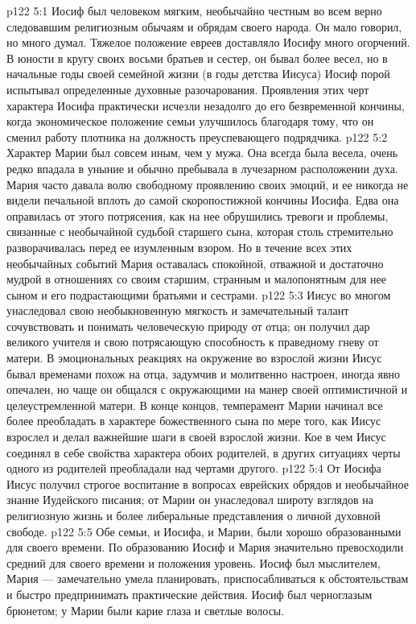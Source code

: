 \vs p122 5:1 Иосиф был человеком мягким, необычайно честным во всем верно следовавшим религиозным обычаям и обрядам своего народа. Он мало говорил, но много думал. Тяжелое положение евреев доставляло Иосифу много огорчений. В юности в кругу своих восьми братьев и сестер, он бывал более весел, но в начальные годы своей семейной жизни (в годы детства Иисуса) Иосиф порой испытывал определенные духовные разочарования. Проявления этих черт характера Иосифа практически исчезли незадолго до его безвременной кончины, когда экономическое положение семьи улучшилось благодаря тому, что он сменил работу плотника на должность преуспевающего подрядчика.
\vs p122 5:2 Характер Марии был совсем иным, чем у мужа. Она всегда была весела, очень редко впадала в уныние и обычно пребывала в лучезарном расположении духа. Мария часто давала волю свободному проявлению своих эмоций, и ее никогда не видели печальной вплоть до самой скоропостижной кончины Иосифа. Едва она оправилась от этого потрясения, как на нее обрушились тревоги и проблемы, связанные с необычайной судьбой старшего сына, которая столь стремительно разворачивалась перед ее изумленным взором. Но в течение всех этих необычайных событий Мария оставалась спокойной, отважной и достаточно мудрой в отношениях со своим старшим, странным и малопонятным для нее сыном и его подрастающими братьями и сестрами.
\vs p122 5:3 Иисус во многом унаследовал свою необыкновенную мягкость и замечательный талант сочувствовать и понимать человеческую природу от отца; он получил дар великого учителя и свою потрясающую способность к праведному гневу от матери. В эмоциональных реакциях на окружение во взрослой жизни Иисус бывал временами похож на отца, задумчив и молитвенно настроен, иногда явно опечален, но чаще он общался с окружающими на манер своей оптимистичной и целеустремленной матери. В конце концов, темперамент Марии начинал все более преобладать в характере божественного сына по мере того, как Иисус взрослел и делал важнейшие шаги в своей взрослой жизни. Кое в чем Иисус соединял в себе свойства характера обоих родителей, в других ситуациях черты одного из родителей преобладали над чертами другого.
\vs p122 5:4 От Иосифа Иисус получил строгое воспитание в вопросах еврейских обрядов и необычайное знание Иудейского писания; от Марии он унаследовал широту взглядов на религиозную жизнь и более либеральные представления о личной духовной свободе.
\vs p122 5:5 Обе семьи, и Иосифа, и Марии, были хорошо образованными для своего времени. По образованию Иосиф и Мария значительно превосходили средний для своего времени и положения уровень. Иосиф был мыслителем, Мария --- замечательно умела планировать, приспосабливаться к обстоятельствам и быстро предпринимать практические действия. Иосиф был черноглазым брюнетом; у Марии были карие глаза и светлые волосы.
